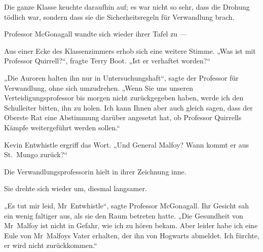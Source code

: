 Die ganze Klasse keuchte daraufhin auf; es war nicht so sehr, dass die Drohung tödlich war, sondern dass sie die Sicherheitsregeln für Verwandlung brach.

Professor McGonagall wandte sich wieder ihrer Tafel zu —

Aus einer Ecke des Klassenzimmers erhob sich eine weitere Stimme.
„Was ist mit Professor Quirrell?“, fragte Terry Boot.
„Ist er verhaftet worden?“

„Die Auroren halten ihn nur in Untersuchungshaft“, sagte der Professor für Verwandlung, ohne sich umzudrehen.
„Wenn Sie uns unseren Verteidigungsprofessor bis morgen nicht zurückgegeben haben, werde ich den Schulleiter bitten, ihn zu holen. Ich kann Ihnen aber auch gleich sagen, dass der Oberste Rat eine Abstimmung darüber angesetzt hat, ob Professor Quirrells Kämpfe weitergeführt werden sollen.“

Kevin Entwhistle ergriff das Wort.
„Und General Malfoy? Wann kommt er aus St.~Mungo zurück?“

Die Verwandlungsprofessorin hielt in ihrer Zeichnung inne.

Sie drehte sich wieder um, diesmal langsamer.

„Es tut mir leid, Mr~Entwhistle“, sagte Professor McGonagall. Ihr Gesicht sah ein wenig faltiger aus, als sie den Raum betreten hatte.
„Die Gesundheit von Mr~Malfoy ist nicht in Gefahr, wie ich zu hören bekam. Aber leider habe ich eine Eule von Mr~Malfoys Vater erhalten, der ihn von Hogwarts abmeldet. Ich fürchte, er wird nicht zurückkommen.“
